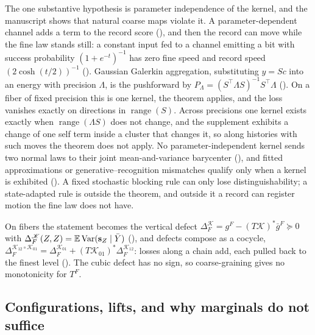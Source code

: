 The one substantive hypothesis is parameter independence of the kernel, and the manuscript shows that
natural coarse maps violate it. A parameter-dependent channel adds a term to the record score
(), and then the record can move while the fine law
stands still: a constant input fed to a channel emitting a bit with success probability
$(1+e^{-t})^{-1}$ has zero fine speed and record speed $(2\cosh(t/2))^{-1}$
(). Gaussian Galerkin aggregation, substituting $y=Sc$ into an
energy with precision $\Lambda$, is the pushforward by $P_\Lambda=(S^\top\Lambda S)^{-1}S^\top
\Lambda$ (). On a fiber of fixed precision this is one kernel, the
theorem applies, and the loss vanishes exactly on directions in $\operatorname{range}(S)$. Across
precisions one kernel exists exactly when $\operatorname{range}(\Lambda S)$ does not change, and the
supplement exhibits a change of one self term inside a cluster that changes it, so along histories
with such moves the theorem does not apply. No parameter-independent kernel sends two normal laws to their joint mean-and-variance
barycenter (), and fitted approximations or
generative--recognition mismatches qualify only when a kernel is exhibited
(). A fixed stochastic blocking rule can only lose distinguishability; a
state-adapted rule is outside the theorem, and outside it a record can register motion the fine law
does not have.

On fibers the statement becomes the vertical defect $\Delta^{\mathscr K}_F=g^F-(T\mathscr K)^*\bar g^F
\succeq0$ with $\Delta^{\mathscr K}_F(Z,Z)=\mathbb E\operatorname{Var}(\mathbf s_Z\mid\bar Y)$
(), and defects compose as a cocycle,
$\Delta_F^{\mathscr K_{12}\circ\mathscr K_{01}}=\Delta_F^{\mathscr K_{01}}+(T\mathscr K_{01})^*
\Delta_F^{\mathscr K_{12}}$: losses along a chain add, each pulled back to the finest level
(). The cubic defect has no sign, so coarse-graining gives no
monotonicity for $T^F$.

\subsection{Configurations, lifts, and why marginals do not suffice}
\label{comp:ch07-formulas-lift}

